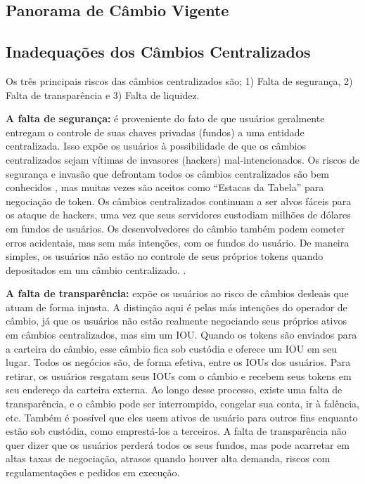 \documentclass[UTF8,nofonts]{article}
\begin{document}
\begin{multicols}{2}
\section{Panorama de Câmbio Vigente\label{sec:current_exchange_landscape}}

\subsection{Inadequações dos Câmbios Centralizados}
Os três principais riscos das câmbios centralizados são; 1) Falta de segurança, 2) Falta de transparência e 3) Falta de liquidez.

\textbf{A falta de segurança:} é proveniente do fato de que usuários geralmente entregam o controle de suas chaves privadas (fundos) a uma entidade centralizada. Isso expõe os usuários à possibilidade de que os câmbios centralizados sejam vítimas de invasores (hackers) mal-intencionados. Os riscos de segurança e invasão que defrontam todos os câmbios centralizados são bem conhecidos \cite{coincheckhack}  \cite{mcmillan2014inside}, mas muitas vezes são aceitos como “Estacas da Tabela” para negociação de token. Os câmbios centralizados continuam a ser alvos fáceis para os ataque de hackers, uma vez que seus servidores custodiam milhões de dólares em fundos de usuários. Os desenvolvedores do câmbio também podem cometer erros acidentais, mas sem más intenções, com os fundos do usuário. De maneira simples, os usuários não estão no controle de seus próprios tokens quando depositados em um câmbio centralizado.
.

\textbf{A falta de transparência:} expõe os usuários ao risco de câmbios desleais que atuam de forma injusta. A distinção aqui é pelas más intenções do operador de câmbio, já que os usuários não estão realmente negociando seus próprios ativos em câmbios centralizados, mas sim um IOU. Quando os tokens são enviados para a carteira do câmbio, esse câmbio fica sob custódia e oferece um IOU em seu lugar. Todos os negócios são, de forma efetiva, entre os IOUs dos usuários.  Para retirar, os usuários resgatam seus IOUs com o câmbio e recebem seus tokens em seu endereço da carteira externa. Ao longo desse processo, existe uma falta de transparência, e o câmbio pode ser interrompido, congelar sua conta, ir à falência, etc. Também é possível que eles usem ativos de usuário para outros fins enquanto estão sob custódia, como emprestá-los a terceiros. A falta de transparência não quer dizer que os usuários perderá todos os seus fundos, mas pode acarretar em altas taxas de negociação, atrasos quando houver alta demanda, riscos com regulamentações e pedidos em execução.


\end{multicols}
\end{document}
